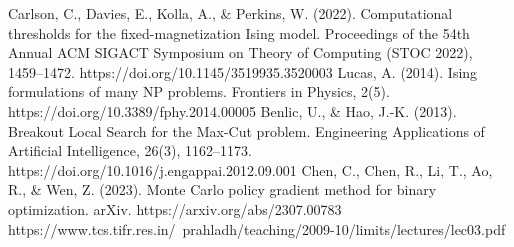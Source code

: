 \documentclass[conference]{IEEEtran}
\begin{document}
\begin{thebibliography}{00}
Carlson, C., Davies, E., Kolla, A., \& Perkins, W. (2022). Computational thresholds for the fixed-magnetization Ising model. Proceedings of the 54th Annual ACM SIGACT Symposium on Theory of Computing (STOC 2022), 1459–1472. https://doi.org/10.1145/3519935.3520003
Lucas, A. (2014). Ising formulations of many NP problems. Frontiers in Physics, 2(5). https://doi.org/10.3389/fphy.2014.00005
Benlic, U., \& Hao, J.-K. (2013). Breakout Local Search for the Max-Cut problem. Engineering Applications of Artificial Intelligence, 26(3), 1162–1173. https://doi.org/10.1016/j.engappai.2012.09.001
Chen, C., Chen, R., Li, T., Ao, R., \& Wen, Z. (2023). Monte Carlo policy gradient method for binary optimization. arXiv. https://arxiv.org/abs/2307.00783
 https://www.tcs.tifr.res.in/~prahladh/teaching/2009-10/limits/lectures/lec03.pdf

\end{thebibliography}
\end{document}
